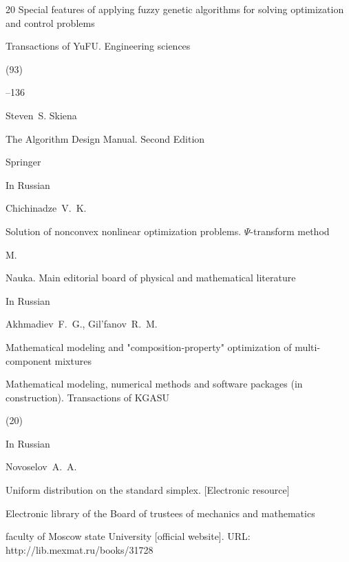\begin{thebibliography}{20}
\paper Special features of applying fuzzy genetic algorithms for solving optimization and control problems

\jour Transactions of YuFU. Engineering sciences


(93)

--136




\by Steven~S. Skiena

\book The Algorithm Design Manual. Second Edition

\publaddr Springer






\lang In Russian

\by Chichinadze~V.~K.

\book Solution of nonconvex nonlinear optimization problems. $\Psi$-transform method

\publaddr M.

\publ Nauka. Main editorial board of physical and mathematical literature






\lang In Russian

\by Akhmadiev~F.~G., Gil'fanov~R.~M.

\paper Mathematical modeling and "composition-property" optimization of multi-component mixtures

\jour Mathematical modeling, numerical methods and software packages (in construction). Transactions of KGASU


(20)




\lang In Russian

\by Novoselov~A.~A.

\paper Uniform distribution on the standard simplex.  [Electronic resource]

\inbook Electronic library of the Board of trustees of mechanics and mathematics

faculty of Moscow state University [official website]. URL: http://lib.mexmat.ru/books/31728




\end{thebibliography}
